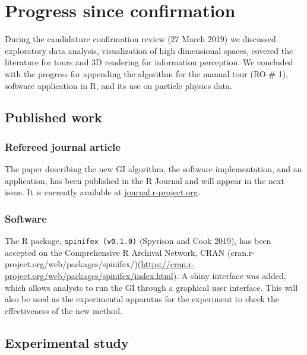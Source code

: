 \documentclass[11,]{article}
\begin{document}
\hypertarget{progress-since-confirmation}{%
\section{Progress since confirmation}\label{progress-since-confirmation}}

During the candidature confirmation review (27 March 2019) we discussed exploratory data analysis, visualization of high dimensional spaces, covered the literature for tours and 3D rendering for information perception. We concluded with the progress for appending the algorithm for the manual tour (RO \# 1), software application in R, and its use on particle physics data.

\hypertarget{published-work}{%
\subsection{Published work}\label{published-work}}

\hypertarget{refereed-journal-article}{%
\subsubsection{Refereed journal article}\label{refereed-journal-article}}

The paper describing the new GI algorithm, the software implementation, and an application, has been published in the R Journal and will appear in the next issue. It is currently available at \href{https://journal.r-project.org/}{journal.r-project.org}.

\hypertarget{software}{%
\subsubsection{Software}\label{software}}

The R package, \texttt{spinifex\ (v0.1.0)} (Spyrison and Cook 2019), has been accepted on the Comprehensive R Archival Network, CRAN (cran.r-project.org/web/packages/spinifex/)(\url{https://cran.r-project.org/web/packages/spinifex/index.html}). A shiny interface was added, which allows analysts to run the GI through a graphical user interface. This will also be used as the experimental apparatus for the experiment to check the effectiveness of the new method.

\hypertarget{sec:expStudy}{%
\subsection{Experimental study}\label{sec:expStudy}}
\end{document}
